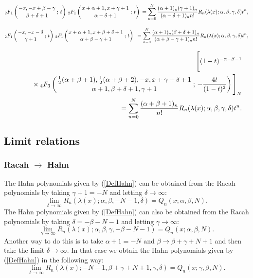 \documentclass[envcountchap,graybox]{svmono}
\newcounter{rom}
\newcommand{\hyp}[5]{\mbox{}_{#1}{F}_{#2}
\left(\genfrac{}{}{0pt}{}{#3}{#4}\,;\,#5\right)}
\newcommand{\mathindent}{\hspace{7.5mm}}
\begin{document}
\begin{eqnarray}
\label{GenRacah2}
\hyp{2}{1}{-x,-x+\beta-\gamma}{\beta+\delta+1}{t}\,\hyp{2}{1}{x+\alpha+1,x+\gamma+1}{\alpha-\delta+1}{t}
{}=\sum_{n=0}^N\frac{(\alpha+1)_n(\gamma+1)_n}{(\alpha-\delta+1)_nn!}
R_n(\lambda(x);\alpha,\beta,\gamma,\delta)t^n,
\end{eqnarray}

\begin{eqnarray}
\label{GenRacah3}
\hyp{2}{1}{-x,-x-\delta}{\gamma+1}{t}\,\hyp{2}{1}{x+\alpha+1,x+\beta+\delta+1}{\alpha+\beta-\gamma+1}{t}\
{}=\sum_{n=0}^N\frac{(\alpha+1)_n(\beta+\delta+1)_n}{(\alpha+\beta-\gamma+1)_nn!}
R_n(\lambda(x);\alpha,\beta,\gamma,\delta)t^n,
\end{eqnarray}

\begin{eqnarray}
\label{GenRacah4}
& &\Bigg[(1-t)^{-\alpha-\beta-1}\nonumber\\
& &{}\mathindent\times\hyp{4}{3}{\frac{1}{2}(\alpha+\beta+1),\frac{1}{2}(\alpha+\beta+2),-x,x+\gamma+\delta+1}
{\alpha+1,\beta+\delta+1,\gamma+1}{-\frac{4t}{(1-t)^2}}\Bigg]_N\nonumber\\
& &{}=\sum_{n=0}^N\frac{(\alpha+\beta+1)_n}{n!}R_n(\lambda(x);\alpha,\beta,\gamma,\delta)t^n.
\end{eqnarray}

\subsection*{Limit relations}

\subsubsection*{Racah $\rightarrow$ Hahn}
The Hahn polynomials given by (\ref{DefHahn}) can be obtained from the Racah polynomials
by taking $\gamma+1=-N$ and letting $\delta\rightarrow\infty$:
\begin{equation}
\lim_{\delta\rightarrow\infty}
R_n(\lambda(x);\alpha,\beta,-N-1,\delta)=Q_n(x;\alpha,\beta,N).
\end{equation}
The Hahn polynomials given by (\ref{DefHahn}) can also be obtained from the Racah polynomials
by taking $\delta=-\beta-N-1$ and letting $\gamma\rightarrow\infty$:
\begin{equation}
\lim_{\gamma\rightarrow\infty}
R_n(\lambda(x);\alpha,\beta,\gamma,-\beta-N-1)=Q_n(x;\alpha,\beta,N).
\end{equation}
Another way to do this is to take $\alpha+1=-N$ and $\beta\rightarrow\beta+\gamma+N+1$ and then
take the limit $\delta\rightarrow\infty$. In that case we obtain the Hahn polynomials given by
(\ref{DefHahn}) in the following way:
\begin{equation}
\lim_{\delta\rightarrow\infty}
R_n(\lambda(x);-N-1,\beta+\gamma+N+1,\gamma,\delta)=Q_n(x;\gamma,\beta,N).
\end{equation}
\end{document}
